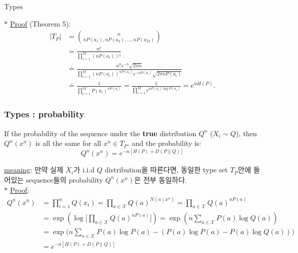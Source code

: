 \documentclass[9pt]{beamer}
\begin{document}
\begin{section}{Types}
\begin{frame}
            $\ast$ \underline{Proof} (Theorem 5): 
            $$
            \begin{aligned}
            \left|T_P\right| & =\binom{n}{n P\left(a_1\right), n P\left(a_2\right), \ldots, n P\left(a_M\right)} \\
            & =\frac{n!}{\prod_{i=1}^M\left(n P\left(a_i\right)\right)!} \\
            & \doteq \frac{n^n e^{-n} \sqrt{2 \pi n}}{\prod_{i=1}^M\left(n P\left(a_i\right)\right)^{n P\left(a_i\right)} e^{-n P\left(a_i\right)} \sqrt{2 \pi n P\left(a_i\right)}} \\
            & \doteq \frac{1}{\prod_{i=1}^M P\left(a_i\right)^{n P\left(a_i\right)}}=\frac{1}{\prod_{i=1}^M e^{n P\left(a_i\right) \log P\left(a_i\right)}}=e^{n H(P)} .
            \end{aligned}
            $$
        \end{frame}

        \begin{frame}
            \frametitle{Types : probability}
            \begin{theorem}
                If the probability of the sequence under the \textbf{true} distribution $Q^n$ ($X_i \sim Q$), 
                then $Q^n\left(x^n\right)$ is all the same for all $x^n \in T_P$.
                and the probability is:
                $$Q^n\left(x^n\right)=e^{-n[H(P)+D(P \| Q)]} $$ 
            \end{theorem}
            \vspace{0.2cm}
            \checkmark \underline{meaning}:
            만약 실제 $X_i$가 i.i.d $Q$ distribution을 따른다면, 동일한 type set $T_P$안에 들어있는 sequence들의 probability $Q^n(x^n)$은 전부 동일하다.
            \vspace{0.2cm}
            \\$\ast$ \underline{Proof}:
            $$ 
            \begin{aligned}
                Q^n\left(x^n\right) & =\prod_{i=1}^n Q\left(x_i\right) =\prod_{a \in \mathcal X} Q(a)^{N\left(a \mid x^n\right)} =\prod_{a \in \mathcal  X} Q(a)^{n P(a)} \\
                & = \exp\left(\log \bigg[\prod_{a \in \mathcal  X} Q(a)^{n P(a)} \bigg]\right) = \exp \left( n \sum_{a \in \mathcal  X} P(a) \log Q(a) \right) \\
                & = \exp \Big( n \sum_{a \in \mathcal  X} P(a) \log P(a)  - (P(a) \log P(a) - P(a) \log Q(a)) \Big) \\&= \boxed{e^{-n[H(P) + D(P\| Q)]}}
            \end{aligned}
            $$ 
        \end{frame}
        


\end{section}
\end{document}

